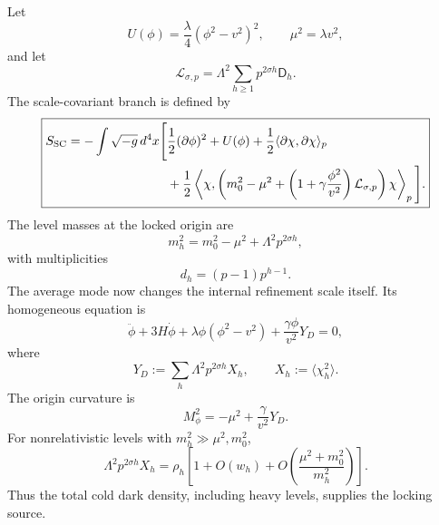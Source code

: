 Let
\begin{equation}
 U(\phi)=\frac{\lambda}{4}(\phi^2-v^2)^2,
 \qquad
 \mu^2=\lambda v^2,
 \label{eq:scw-average-potential}
\end{equation}
and let
\begin{equation}
 \mathcal L_{\sigma,p}
 =\Lambda^2\sum_{h\geq1}p^{2\sigma h}\mathsf D_h.
 \label{eq:scw-fiber-operator}
\end{equation}
The scale-covariant branch is defined by
\begin{equation}
\boxed{
\begin{aligned}
 S_{\rm SC}
 =-\int\sqrt{-g}\,d^4x\Bigg[
 &\frac12(\partial\phi)^2+U(\phi)
 +\frac12\langle\partial\chi,\partial\chi\rangle_p\\
 &+\frac12\left\langle
 \chi,
 \left(
 m_0^2-\mu^2
 +\left(1+\gamma\frac{\phi^2}{v^2}\right)
 \mathcal L_{\sigma,p}
 \right)\chi
 \right\rangle_p
 \Bigg].
\end{aligned}}
 \label{eq:scw-action}
\end{equation}
The level masses at the locked origin are
\begin{equation}
 m_h^2
 =m_0^2-\mu^2+\Lambda^2p^{2\sigma h},
 \label{eq:scw-level-masses}
\end{equation}
with multiplicities
\begin{equation}
 d_h=(p-1)p^{h-1}.
 \label{eq:scw-level-degeneracy}
\end{equation}
The average mode now changes the internal refinement scale itself.  Its homogeneous equation is
\begin{equation}
 \ddot\phi+3H\dot\phi
 +\lambda\phi(\phi^2-v^2)
 +\frac{\gamma\phi}{v^2}Y_D=0,
 \label{eq:scw-average-eom}
\end{equation}
where
\begin{equation}
 Y_D
 :=\sum_h\Lambda^2p^{2\sigma h}X_h,
 \qquad
 X_h:=\langle\chi_h^2\rangle.
 \label{eq:scw-weighted-lock-source}
\end{equation}
The origin curvature is
\begin{equation}
 \boxed{
 M_\phi^2
 =-\mu^2+\frac{\gamma}{v^2}Y_D.}
 \label{eq:scw-lock-curvature}
\end{equation}
For nonrelativistic levels with $m_h^2\gg\mu^2,m_0^2$,
\begin{equation}
 \Lambda^2p^{2\sigma h}X_h
 =\rho_h\left[1+O(w_h)+O\left(\frac{\mu^2+m_0^2}{m_h^2}\right)\right].
 \label{eq:scw-weighted-energy-limit}
\end{equation}
Thus the total cold dark density, including heavy levels, supplies the locking source.

